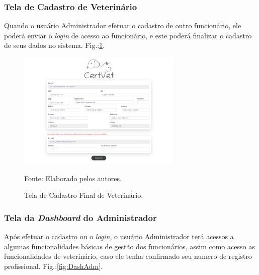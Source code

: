 \documentclass[
    12pt,               %
    openright,          %
    oneside,
    a4paper,            %
    BIBLATEX,           %
    TODO,               %
    english,            %
    brazil              %
    ]{ifsp-spo-inf-ctds}
\begin{document}
\subsubsection{Tela de Cadastro de Veterinário}
Quando o usuário Administrador efetuar o cadastro de outro funcionário, ele poderá enviar o \emph{login} de acesso ao funcionário, e este poderá finalizar o cadastro de seus dados no sistema. Fig.:\ref{fig:CadVet}.  

            \begin{figure}[H]
                \centering
                \caption{Tela de Cadastro Final de Veterinário.}
                \includegraphics[width=0.7\textwidth]{images/Telas/Pagina cadastro final - VETERINARIO.png}
                
                \label{fig:CadVet}
                \centering
        {\footnotesize Fonte: Elaborado pelos autores.}
            \end{figure}


\subsubsection{Tela da \emph{Dashboard} do Administrador}

Após efetuar o cadastro ou o \emph{login}, o usuário Administrador terá acessos a algumas funcionalidades básicas de gestão dos funcionários, assim como acesso as funcionalidades de veterinário, caso ele tenha confirmado seu numero de registro profissional. Fig.:\ref{fig:DashAdm}.
\end{document}
